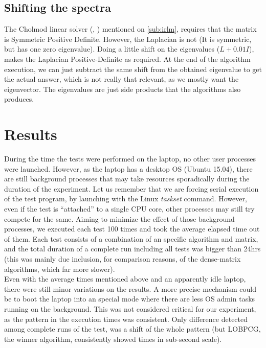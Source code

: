 \subsection{Shifting the spectra}

The \gls{Cholmod} linear solver (\cite{cholmod08},
  \cite{cholmod08a}) mentioned on \cref{sub:irlm}, requires
that the matrix is Symmetric Positive Definite. However, the
\gls{Laplacian} is not (It is symmetric, but has 
one zero eigenvalue). Doing a little shift on the eigenvalues ($L +
0.01I$), makes the \gls{Laplacian} Positive-Definite as required. At the
end of the algorithm execution, we can just subtract the same shift from
the obtained eigenvalue to get the actual answer, which is not really
that relevant, as we mostly want the eigenvector. The eigenvalues are
just side products that the algorithms also produces. 

\section{Results}

During the time the tests were performed on the laptop, no other
user processes were launched. However, as the laptop has a desktop OS
(Ubuntu 15.04), there are still background 
processes that may take resources sporadically during the duration of
the experiment. Let us remember that we are forcing serial execution
of the test program, by launching with the Linux \emph{taskset}
command. However, even if the test is ``attached'' to a single CPU
core, other processes may still try compete for the same. Aiming to
minimize the effect of those background 
processes, we executed each test 100 times and took the average
elapsed time out of them. Each test consists of a combination of
an specific algorithm and matrix, and the total duration of a complete
run including all tests was bigger than 24hrs (this was mainly due
inclusion, for comparison reasons, of the dense-matrix algorithms,
which far more slower). \\

Even with the average times mentioned above and an apparently idle
laptop, there were still minor
variations on the results. A more precise mechanism could be to boot
the laptop into an special mode where there are less OS admin tasks
running on the background. This was not considered critical for our
experiment, as the pattern in the execution times was consistent. Only
difference detected among complete runs of the test, was a shift of
the whole pattern (but \gls{LOBPCG}, the winner algorithm,
consistently showed times in sub-second scale). \\ 

